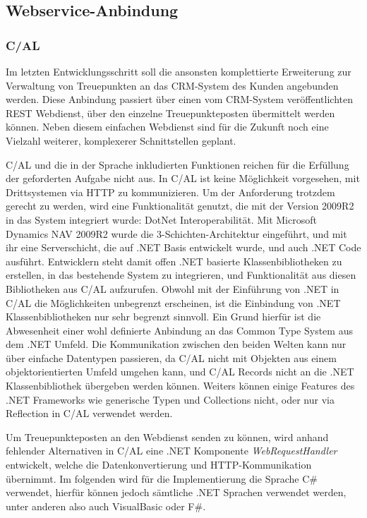 \subsection{Webservice-Anbindung}
\subsubsection{C/AL}
Im letzten Entwicklungsschritt soll die ansonsten komplettierte Erweiterung zur Verwaltung von Treuepunkten an das CRM-System des Kunden angebunden werden. Diese Anbindung passiert über einen vom CRM-System veröffentlichten REST Webdienst, über den einzelne Treuepunkteposten übermittelt werden können. Neben diesem einfachen Webdienst sind für die Zukunft noch eine Vielzahl weiterer, komplexerer Schnittstellen geplant. \linebreak

C/AL und die in der Sprache inkludierten Funktionen reichen für die Erfüllung der geforderten Aufgabe nicht aus. In C/AL ist keine Möglichkeit vorgesehen, mit Drittsystemen via HTTP zu kommunizieren. Um der Anforderung trotzdem gerecht zu werden, wird eine Funktionalität genutzt, die mit der Version 2009R2 in das System integriert wurde: DotNet Interoperabilität. Mit Microsoft Dynamics NAV 2009R2 wurde die 3-Schichten-Architektur eingeführt, und mit ihr eine Serverschicht, die auf .NET Basis entwickelt wurde, und auch .NET Code ausführt. Entwicklern steht damit offen .NET basierte Klassenbibliotheken zu erstellen, in das bestehende System zu integrieren, und Funktionalität aus diesen Bibliotheken aus C/AL aufzurufen. Obwohl mit der Einführung von .NET in C/AL die Möglichkeiten unbegrenzt erscheinen, ist die Einbindung von .NET Klassenbibliotheken nur sehr begrenzt sinnvoll. Ein Grund hierfür ist die Abwesenheit einer wohl definierte Anbindung an das Common Type System aus dem .NET Umfeld. Die Kommunikation zwischen den beiden Welten kann nur über einfache Datentypen passieren, da C/AL nicht mit Objekten aus einem objektorientierten Umfeld umgehen kann, und C/AL Records nicht an die .NET Klassenbibliothek übergeben werden können. Weiters können einige Features des .NET Frameworks wie generische Typen und Collections nicht, oder nur via Reflection in C/AL verwendet werden. \linebreak

Um Treuepunkteposten an den Webdienst senden zu können, wird anhand fehlender Alternativen in C/AL eine .NET Komponente \textit{WebRequestHandler} entwickelt, welche die Datenkonvertierung und HTTP-Kommunikation übernimmt. Im folgenden wird für die Implementierung die Sprache C\# verwendet, hierfür können jedoch sämtliche .NET Sprachen verwendet werden, unter anderen also auch VisualBasic oder F\#.\linebreak
\pagebreak


